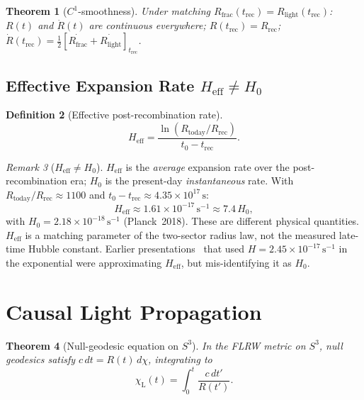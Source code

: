 \documentclass[12pt,a4paper]{amsart}
\theoremstyle{plain}
\newtheorem{theorem}{Theorem}[section]
\theoremstyle{definition}
\newtheorem{definition}[theorem]{Definition}
\theoremstyle{remark}
\newtheorem{remark}[theorem]{Remark}
\newcommand{\Sthree}{S^3}
\newcommand{\Heff}{H_{\mathrm{eff}}}
\newcommand{\trec}{t_{\mathrm{rec}}}
\newcommand{\Rrec}{R_{\mathrm{rec}}}
\newcommand{\half}{\tfrac{1}{2}}
\newcommand{\Rfrac}{R_{\mathrm{frac}}}
\newcommand{\Rlight}{R_{\mathrm{light}}}
\newcommand{\chiL}{\chi_{\mathrm{L}}}
\begin{document}
\begin{theorem}[$C^1$-smoothness]
  \label{thm:C1}
  Under matching $\Rfrac(\trec)=\Rlight(\trec)$: $R(t)$ and $\dot R(t)$
  are continuous everywhere; $R(\trec)=\Rrec$;
  $\dot R(\trec)=\half[\dot{\Rfrac}+\dot{\Rlight}]_{\trec}$.
\end{theorem}

\subsection{Effective Expansion Rate $\Heff\neq H_0$}

\begin{definition}[Effective post-recombination rate]
  \label{def:Heff}
  \begin{equation}
    \Heff = \frac{\ln(R_{\mathrm{today}}/\Rrec)}{t_0-\trec}.
    \label{eq:Heff}
  \end{equation}
\end{definition}

\begin{remark}[$\Heff\neq H_0$]
  $\Heff$ is the \emph{average} expansion rate over the post-recombination
  era; $H_0$ is the present-day \emph{instantaneous} rate.
  With $R_{\mathrm{today}}/\Rrec\approx 1100$ and $t_0-\trec\approx 4.35\times 10^{17}\,\mathrm{s}$:
  \begin{equation}
    \Heff\approx 1.61\times 10^{-17}\,\mathrm{s}^{-1}\approx 7.4\,H_0,
    \label{eq:Heffvalue}
  \end{equation}
  with $H_0=2.18\times 10^{-18}\,\mathrm{s}^{-1}$ (Planck~2018).
  These are different physical quantities. $\Heff$ is a
  matching parameter of the two-sector radius law, not the measured
  late-time Hubble constant. Earlier
  presentations~\cite{Preece2025FBS3R_GoldenRatio} that used
  $H=2.45\times 10^{-17}\,\mathrm{s}^{-1}$ in the exponential were
  approximating $\Heff$, but mis-identifying it as $H_0$.
\end{remark}

\section{Causal Light Propagation}
\label{sec:lightprop}

\begin{theorem}[Null-geodesic equation on $\Sthree$]
  \label{thm:null}
  In the FLRW metric on $\Sthree$, null geodesics satisfy
  $c\,dt = R(t)\,d\chi$, integrating to
  \begin{equation}
    \chiL(t) = \int_0^t \frac{c\,dt'}{R(t')}.
    \label{eq:chiLdef}
  \end{equation}
\end{theorem}
\end{document}
